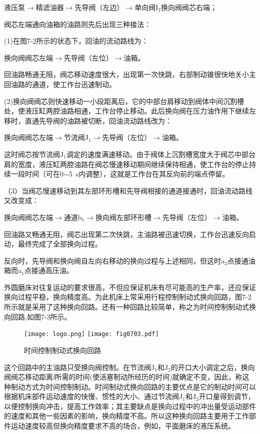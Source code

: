 液压泵$\rightarrow$精滤油器$\rightarrow$先导阀（左边）$\rightarrow$单向阀I$_2$换向阀阀芯右端；

阀芯左端通向油箱的油路则先后出现三种接法：

(1)在图7-2所示的状态下，回油的流动路线为：

换向阀阀芯左端$\rightarrow$先导阀（左位）$\rightarrow$油箱。

回油路畅通无阻，阀芯移动速度很大，出现第一次快跳，右部制动锥很快地关小主回油路的通道，使工作台迅速制动。

(2)换向阀阀芯则快速移动一小段距离后，它的中部台肩移动到阀体中间沉割槽处，使液压缸两腔油路相通，工作台停止移动。此后换向阀在压力油作用下继续左移时，直通先导阀的油路被切断，回油流动路线改为：

换向阀阀芯左端$\rightarrow$节流阀J$_1$$\rightarrow$先导阀（左位）$\rightarrow$油箱。

这时阀芯按节流阀J$_1$调定的速度满速移动。由于阀体上沉割槽宽度大于阀芯中部台肩的宽度，液压缸两腔油路在阀芯慢速移动期间继续保持相通，使工作台的停止持续一段时间（可在0$\sim$5\ s内调整），这就是工作台在其反向前的端点停留。

（3）当阀芯慢速移动到其左部环形槽和先导阀相接的通道接通时，回油流动路线又改变成：

换向阀阀芯左端$\rightarrow$通道b$_1$$\rightarrow$换向阀左部环形槽$\rightarrow$先导阀（左位）$\rightarrow$油箱。

回油路又畅通无阻，阀芯出现第二次快跳，主油路被迅速切换，工作台迅速反向启动，最终完成了全部换向过程。

反向时，先导阀和换向阀自左向右移动的换向过程与上述相同，但这时a$_2$点接通油箱而a$_1$点接通高压油。

外圆磨床对往复运动的要求很高，不但应保证机床有尽可能高的生产率，还应保证换向过程平稳，换向精度高。为此机床上常采用行程控制制动式换向回路，图7-2所示就是采用了这种换向回路。还有一种回路比较简单，称之为时间控制制动式换向回路,如图7-3所示。

\begin{figure}
    \centering
    \ifOpenSource
    \texttt{[image: logo.png]}
    \else
    \texttt{[image: fig0703.pdf]}%
    \fi
    \caption{时间控制制动式换向回路}
    \label{fig:fig0703}%
\end{figure}

这个回路中的主油路只受换向阀控制。在节流阀J$_1$和J$_2$的开口大小调定之后，换向阀阀芯移动距离\emph{l}所需的时间(使活塞制动所经历的时间)就确定不变，因此，称这种制动方式为时间控制制动。时间制动式换向回路的主要优点是它的制动时间可以根据机床部件运动速度的快慢、惯性的大小、通过节流阀J$_1$和J$_2$开口量得到调节，以便控制换向冲击，提高工作效率；其主要缺点是换向过程中的冲出量受运动部件的速度和其他一些因素的影响，换向精度不高。所以这种换向回路主要用于工作部件运动速度较高但换向精度要求不高的场合，例如，平面磨床的液压系统。

